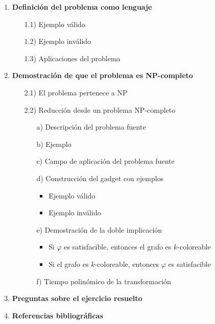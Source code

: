 \documentclass[a4paper,12pt]{article}
\begin{document}
\begin{enumerate}
  \item \textbf{Definición del problema como lenguaje}
  \begin{enumerate}
    \item[1.1)] Ejemplo válido
    \item[1.2)] Ejemplo inválido
    \item[1.3)] Aplicaciones del problema
  \end{enumerate}
  
  \item \textbf{Demostración de que el problema es NP-completo}
  \begin{enumerate}
    \item[2.1)] El problema pertenece a NP
    \item[2.2)] Reducción desde un problema NP-completo
    \begin{enumerate}
      \item[a)] Descripción del problema fuente
      \item[b)] Ejemplo 
      \item [c)] Campo de aplicación del problema fuente
      \item[d)] Construcción del gadget con ejemplos
      \begin{itemize}
        \item Ejemplo válido
        \item Ejemplo inválido
      \end{itemize}
      \item[e)] Demostración de la doble implicación
      \begin{itemize}
        \item Si $\varphi$ es satisfacible, entonces el grafo es $k$-coloreable
        \item Si el grafo es $k$-coloreable, entonces $\varphi$ es satisfacible
      \end{itemize}
      \item[f)] Tiempo polinómico de la transformación
    \end{enumerate}
  \end{enumerate}

  \item \textbf{Preguntas sobre el ejercicio resuelto}
  \begin{enumerate}
   
  \end{enumerate}

  \item \textbf{Referencias bibliográficas}
\end{enumerate}
\end{document}
